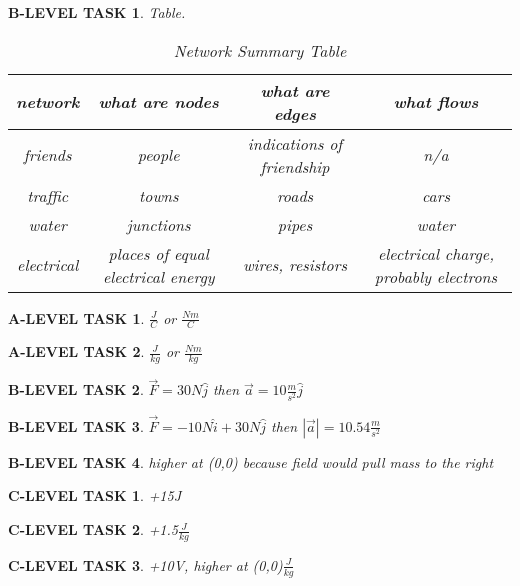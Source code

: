\documentclass{book}
\numberwithin{equation}{section}
\newtheorem{alevel}{A-LEVEL TASK}
\newtheorem{blevel}{B-LEVEL TASK}
\newtheorem{clevel}{C-LEVEL TASK}
\theoremstyle{definition}
\begin{document}
\begin{blevel} Table.\par
\begin{table}[H]
\begin{center}
\begin{tabular}{ |c | c | c | c |} \hline
network	&	what are nodes	& what are edges	& what flows \\ \hline
friends	&	people	& indications of friendship	& n/a \\ \hline
traffic &	towns	& roads				&cars	\\ \hline
water	&	junctions	& pipes				&water	\\ \hline
electrical	& places of equal electrical energy	& wires, resistors	&electrical charge, probably electrons	\\ \hline
\end{tabular}
\caption{Network Summary Table}
\end{center}
\end{table}
\end{blevel}

\begin{alevel}$\frac{J}{C}$ or $\frac{Nm}{C}$\end{alevel}
\begin{alevel}$\frac{J}{kg}$ or $\frac{Nm}{kg}$\end{alevel}
\begin{blevel}$\vec{F}=30N\hat{j}$ then $\vec{a}=10\frac{m}{s^2}\hat{j}$\end{blevel}
\begin{blevel}$\vec{F}=-10N\hat{i}+30N\hat{j}$ then $|\vec{a}|=10.54\frac{m}{s^2}$\end{blevel}
\begin{blevel}higher at (0,0) because field would pull mass to the right\end{blevel}
\begin{clevel}+15J\end{clevel}
\begin{clevel}+1.5$\frac{J}{kg}$\end{clevel}
\begin{clevel}+10V, higher at (0,0)$\frac{J}{kg}$\end{clevel}
\end{document}
